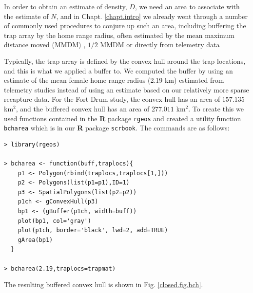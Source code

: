 In order to obtain an estimate of density, $D$, we need an area to
associate with the estimate of $N$, and in Chapt.  \ref{chapt.intro}
we already went through a number of commonly used procedures to
conjure up such an area, including buffering the trap array by the
home range radius, often estimated by the mean maximum distance moved
(MMDM) \citep{parmenter_etal:2003}, $1/2$ MMDM \citep{dice:1938} or
directly from telemetry data \citep{wallace_etal:2003}

Typically, the trap array is defined by the convex hull around the
trap locations, and this is what we applied a buffer to. We computed
the buffer by using an estimate of the mean female home range radius
(2.19 km) estimated from telemetry studies \citep{bales_etal:2005}
instead of using an estimate based on our relatively more sparse
recapture data.  For the Fort Drum study, the convex hull has an area
of $157.135$ km$^2$, and the buffered convex hull has an area of $277.011$
km$^2$.  To create this we used functions contained in the {\bf R}
package \mbox{\tt rgeos} and created a utility function \mbox{\tt
  bcharea} which is in our {\bf R} package \mbox{\tt scrbook}. The
commands are as follows:
\begin{verbatim}
> library(rgeos)

> bcharea <- function(buff,traplocs){
    p1 <- Polygon(rbind(traplocs,traplocs[1,]))
    p2 <- Polygons(list(p1=p1),ID=1)
    p3 <- SpatialPolygons(list(p2=p2))
    p1ch <- gConvexHull(p3)
    bp1 <- (gBuffer(p1ch, width=buff))
    plot(bp1, col='gray')
    plot(p1ch, border='black', lwd=2, add=TRUE)
    gArea(bp1)
  }

> bcharea(2.19,traplocs=trapmat)
\end{verbatim}
The resulting buffered convex hull is shown in Fig. \ref{closed.fig.bch}.
